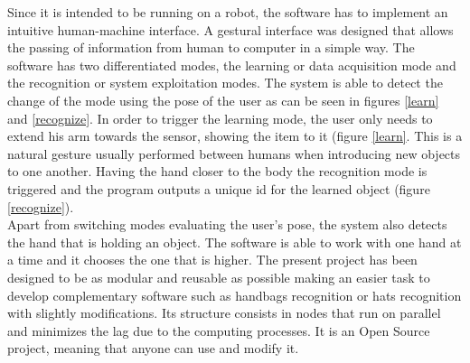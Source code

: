 Since it is intended to be running on a robot, the software has to implement an intuitive human-machine interface. 
A gestural interface was designed that allows the passing of information from human to computer in a simple way. 
The software has two differentiated modes, the learning or data acquisition mode and the recognition or system exploitation modes. 
The system is able to detect the change of the mode using the pose of the user as can be seen in figures \ref{learn} and \ref{recognize}. 
In order to trigger the learning mode, the user only needs to extend his arm towards the sensor, showing the item to it (figure \ref{learn}. 
This is a natural gesture usually performed between humans when introducing new objects to one another. 
Having the hand closer to the body the recognition mode is triggered and the program outputs a unique id for the learned object (figure \ref{recognize}). 
\\

Apart from switching modes evaluating the user's pose, the system also detects the hand that is holding an object. 
The software is able to work with one hand at a time and it chooses the one that is higher. 
The present project has been designed to be as modular and reusable as possible making an easier task to develop complementary software such as handbags recognition or hats recognition with slightly modifications. Its structure consists in nodes that run on parallel and minimizes the lag due to the computing processes. It is an Open Source project, meaning that anyone can use and modify it.

\newpage
	
